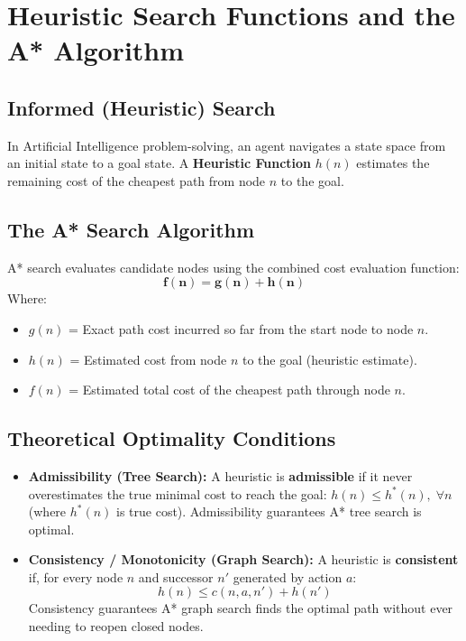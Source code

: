 \section{Heuristic Search Functions and the A* Algorithm}
\label{sec:heuristic_search}

\subsection{Informed (Heuristic) Search}
In Artificial Intelligence problem-solving, an agent navigates a state space from an initial state to a goal state. A \textbf{Heuristic Function} $h(n)$ estimates the remaining cost of the cheapest path from node $n$ to the goal.

\subsection{The A* Search Algorithm}
A* search evaluates candidate nodes using the combined cost evaluation function:
\begin{equation}
\label{eq:astar_formula}
\mathbf{f(n) = g(n) + h(n)}
\end{equation}
Where:
\begin{itemize}
    \item $g(n)$ = Exact path cost incurred so far from the start node to node $n$.
    \item $h(n)$ = Estimated cost from node $n$ to the goal (heuristic estimate).
    \item $f(n)$ = Estimated total cost of the cheapest path through node $n$.
\end{itemize}

\subsection{Theoretical Optimality Conditions}
\begin{itemize}
    \item \textbf{Admissibility (Tree Search):} A heuristic is \textbf{admissible} if it never overestimates the true minimal cost to reach the goal: $h(n) \le h^*(n), \; \forall n$ (where $h^*(n)$ is true cost). Admissibility guarantees A* tree search is optimal.
    \item \textbf{Consistency / Monotonicity (Graph Search):} A heuristic is \textbf{consistent} if, for every node $n$ and successor $n'$ generated by action $a$:
    \begin{equation}
    \label{eq:heuristic_consistency}
    h(n) \le c(n, a, n') + h(n')
    \end{equation}
    Consistency guarantees A* graph search finds the optimal path without ever needing to reopen closed nodes.
\end{itemize}


